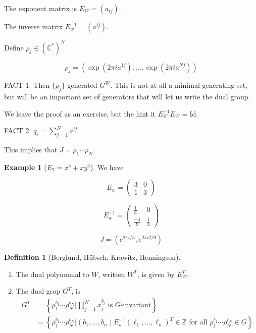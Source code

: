 \documentclass{amsart}
\theoremstyle{definition}
\newtheorem{definition}[dummy]{Definition}
\newtheorem{example}[dummy]{Example}
\newcommand{\Z}{\mathbb{Z}}
\newcommand{\C}{\mathbb{C}}
\begin{document}
The exponent matrix is $E_W=(a_{ij})$.

The inverse matrix $E_w^{-1}=(a^{ij})$. 

Define $\rho_j\in(\C^*)^N$

$$\rho_j=\left(\exp(2\pi i a^{1j}),\dots,\exp(2\pi i a^{Nj})\right)$$

FACT 1:
Then $\{\rho_j\}$ generated $G^W$.  This is not at all a minimal generating set, but will be an important set of generators that will let us write the dual group.  

We leave the proof as an exercise, but the hint it $E_W^{-1} E_W=\text{Id}$.

FACT 2: $q_i=\sum_{j=1}^N a^{ij}$

This implies that $J=\rho_1\cdots\rho_N$.

\begin{example}[$E_7=x^3+xy^3$]

We have

$$E_w=\begin{pmatrix} 3 & 0 \\ 1 & 3 
\end{pmatrix}$$

$$E^{-1}_w=\begin{pmatrix} \frac{1}{3} & 0 \\ \frac{-1}{9} &\frac{1}{3} 
\end{pmatrix} $$

$$J=\left(e^{2\pi i/3}, e^{2\pi i 2/9}\right)$$
\end{example}


\begin{definition}[Berglund, H\"ubsch, Krawitz, Henningson]
\begin{enumerate}
\item The dual polynomial to $W$, written $W^T$, is given by $E_W^T$.
\item The dual grop $G^T$, is
\begin{align*}
G^T&=\left\{ \overline{\rho}_1^{b_1}\cdots \overline{\rho}_N^{b_N} | \prod_{j=1}^N x_j^{b_j} \text{ is $G$-invariant}\right\} \\
&=\left\{ \overline{\rho}_1^{b_1}\cdots \overline{\rho}_N^{b_N} | (b_1,\dots, b_n)E_w^{-1} (\ell_1,\dots,\ell_n)^T\in\Z \text{ for all } \rho_1^{\ell_1}\cdots\rho_N^{\ell_N}\in G\right\}
\end{align*}
\end{enumerate}

\end{definition}
\end{document}
